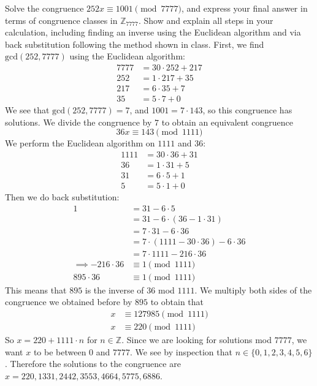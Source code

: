 \documentclass{eh-homework}
\begin{document}
    \begin{question}{1}
        Solve the congruence $252x \equiv 1001 \pmod{7777}$, and express your final answer in terms of congruence classes in $\mathbb{Z}_{7777}$.
        Show and explain all steps in your calculation,
        including finding an inverse using the Euclidean algorithm and via back substitution following the method shown in class.
        \tcblower
        First, we find \(\mathrm{gcd} (252, 7777)\) using the Euclidean algorithm:
        \begin{align*}
            7777 &= 30 \cdot 252 + 217 \\
            252 &= 1 \cdot 217 + 35 \\
            217 &= 6 \cdot 35 + 7 \\
            35 &=  5 \cdot 7 + 0
        \end{align*}
        We see that \(\mathrm{gcd} (252, 7777) = 7\), and \(1001 = 7 \cdot 143\), so this congruence has solutions. We divide the congruence by \(7\) to obtain an equivalent congruence
        \[
            36x \equiv 143 \pmod {1111}
        \]
        We perform the Euclidean algorithm on \(1111\) and \(36\):
        \begin{align*}
            1111 &= 30 \cdot 36 + 31 \\
            36 &= 1 \cdot 31 + 5 \\
            31 &= 6 \cdot 5 + 1 \\
            5 &= 5 \cdot 1 + 0
        \end{align*}
        Then we do back substitution:
        \begin{align*}
            1 &= 31 - 6\cdot5 \\
            &= 31 - 6 \cdot (36 - 1 \cdot 31) \\
            &= 7 \cdot 31 - 6 \cdot 36 \\
            &= 7 \cdot (1111 - 30\cdot 36) - 6 \cdot 36 \\
            &= 7 \cdot 1111 - 216 \cdot 36 \\
            \implies -216 \cdot 36 &\equiv 1 \pmod {1111} \\
            895 \cdot 36 &\equiv 1 \pmod{1111}
        \end{align*}
        This means that \(895\) is the inverse of \(36\) mod \(1111\). We multiply both sides of the congruence we obtained before by \(895\) to obtain that
        \begin{align*}
            x &\equiv 127985 \pmod{1111} \\
            x &\equiv 220 \pmod{1111}
        \end{align*}
        So \(x = 220 + 1111\cdot n\) for \(n \in \mathbb{Z}\). Since we are looking for solutions mod \(7777\), we want \(x\) to be between \(0\) and \(7777\). We see by inspection that \(n \in \{ 0, 1, 2, 3, 4, 5, 6 \}\). Therefore the solutions to the congruence are \(x = 220, 1331, 2442, 3553, 4664, 5775, 6886\).
    \end{question}
\end{document}
